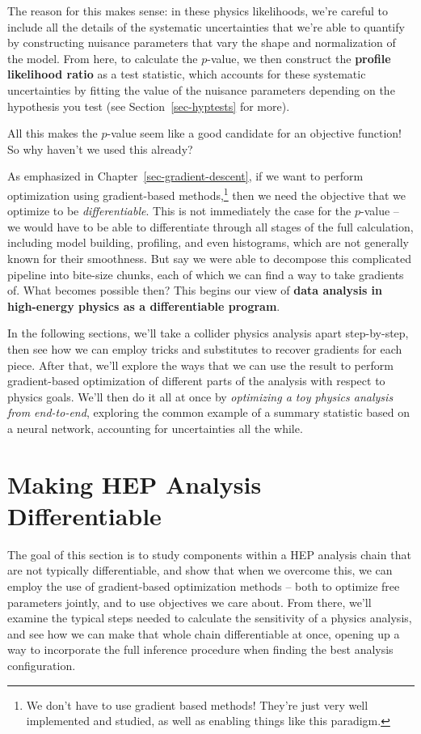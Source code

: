 \documentclass[
  11pt,
  numbers=noendperiod]{book}
\begin{document}
The reason for this makes sense: in these physics likelihoods, we're
careful to include all the details of the systematic uncertainties that
we're able to quantify by constructing nuisance parameters that vary the
shape and normalization of the model. From here, to calculate the
\(p\)-value, we then construct the \textbf{profile likelihood ratio} as
a test statistic, which accounts for these systematic uncertainties by
fitting the value of the nuisance parameters depending on the hypothesis
you test (see Section~\ref{sec-hyptests} for more).

All this makes the \(p\)-value seem like a good candidate for an
objective function! So why haven't we used this already?

As emphasized in Chapter~\ref{sec-gradient-descent}, if we want to
perform optimization using gradient-based methods,\footnote{We don't
  have to use gradient based methods! They're just very well implemented
  and studied, as well as enabling things like this paradigm.} then we
need the objective that we optimize to be \emph{differentiable}. This is
not immediately the case for the \(p\)-value -- we would have to be able
to differentiate through all stages of the full calculation, including
model building, profiling, and even histograms, which are not generally
known for their smoothness. But say we were able to decompose this
complicated pipeline into bite-size chunks, each of which we can find a
way to take gradients of. What becomes possible then? This begins our
view of \textbf{data analysis in high-energy physics as a differentiable
program}.

In the following sections, we'll take a collider physics analysis apart
step-by-step, then see how we can employ tricks and substitutes to
recover gradients for each piece. After that, we'll explore the ways
that we can use the result to perform gradient-based optimization of
different parts of the analysis with respect to physics goals. We'll
then do it all at once by \emph{optimizing a toy physics analysis from
end-to-end}, exploring the common example of a summary statistic based
on a neural network, accounting for uncertainties all the while.

\hypertarget{making-hep-analysis-differentiable}{%
\section{Making HEP Analysis
Differentiable}\label{making-hep-analysis-differentiable}}

The goal of this section is to study components within a HEP analysis
chain that are not typically differentiable, and show that when we
overcome this, we can employ the use of gradient-based optimization
methods -- both to optimize free parameters jointly, and to use
objectives we care about. From there, we'll examine the typical steps
needed to calculate the sensitivity of a physics analysis, and see how
we can make that whole chain differentiable at once, opening up a way to
incorporate the full inference procedure when finding the best analysis
configuration.
\end{document}
